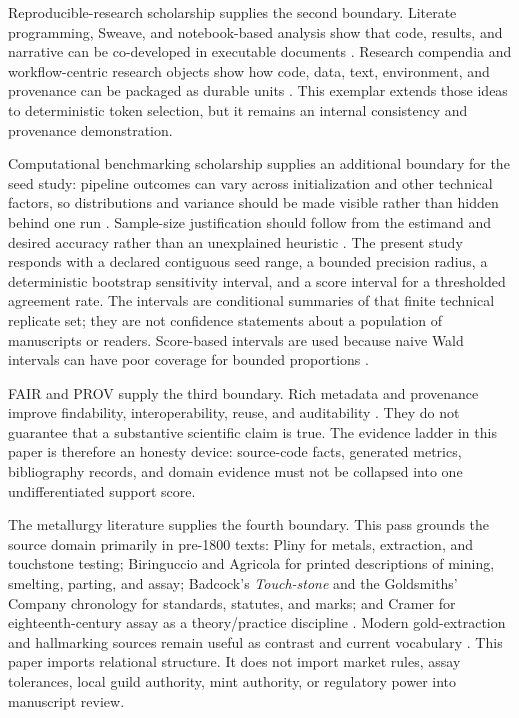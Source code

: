 \documentclass[
  english,
]{article}
\begin{document}
Reproducible-research scholarship supplies the second boundary. Literate
programming, Sweave, and notebook-based analysis show that code,
results, and narrative can be co-developed in executable documents
\citep{knuth1984literate, leisch2002sweave, rule2019jupyter}. Research
compendia and workflow-centric research objects show how code, data,
text, environment, and provenance can be packaged as durable units
\citep{marwick2018packaging, belhajjame2015ontologies}. This exemplar
extends those ideas to deterministic token selection, but it remains an
internal consistency and provenance demonstration.

Computational benchmarking scholarship supplies an additional boundary
for the seed study: pipeline outcomes can vary across initialization and
other technical factors, so distributions and variance should be made
visible rather than hidden behind one run
\citep{bouthillier2021accounting}. Sample-size justification should
follow from the estimand and desired accuracy rather than an unexplained
heuristic \citep{lakens2022samplesize}. The present study responds with
a declared contiguous seed range, a bounded precision radius, a
deterministic bootstrap sensitivity interval, and a score interval for a
thresholded agreement rate. The intervals are conditional summaries of
that finite technical replicate set; they are not confidence statements
about a population of manuscripts or readers. Score-based intervals are
used because naive Wald intervals can have poor coverage for bounded
proportions \citep{newcombe1998proportion}.

FAIR and PROV supply the third boundary. Rich metadata and provenance
improve findability, interoperability, reuse, and auditability
\citep{wilkinson2016fair, moreau2013prov}. They do not guarantee that a
substantive scientific claim is true. The evidence ladder in this paper
is therefore an honesty device: source-code facts, generated metrics,
bibliography records, and domain evidence must not be collapsed into one
undifferentiated support score.

The metallurgy literature supplies the fourth boundary. This pass
grounds the source domain primarily in pre-1800 texts: Pliny for metals,
extraction, and touchstone testing; Biringuccio and Agricola for printed
descriptions of mining, smelting, parting, and assay; Badcock's
\emph{Touch-stone} and the Goldsmiths' Company chronology for standards,
statutes, and marks; and Cramer for eighteenth-century assay as a
theory/practice discipline
\citep{pliny_natural_history_33, biringuccio_pirotechnia_1540, agricola_de_re_metallica_1556, badcock_touchstone_1678, goldsmiths_hallmarking_history, cramer_assaying_metals_1741}.
Modern gold-extraction and hallmarking sources remain useful as contrast
and current vocabulary
\citep{marsden_house_2006, hallmarking_convention_1972, lbma_good_delivery_rules}.
This paper imports relational structure. It does not import market
rules, assay tolerances, local guild authority, mint authority, or
regulatory power into manuscript review.
\end{document}
